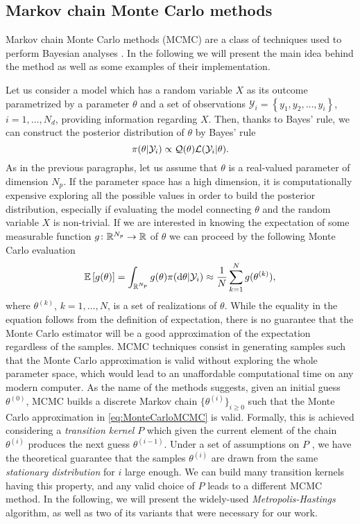 \subsection{Markov chain Monte Carlo methods}

Markov chain Monte Carlo methods (MCMC) are a class of techniques used to perform Bayesian analyses \cite{Gil05, KaS05}. In the following we will present the main idea behind the method as well as some examples of their implementation. 

Let us consider a model which has a random variable $X$ as its outcome parametrized by a parameter $\theta$ and a set of observations $\mathcal{Y}_i = \left\{y_1, y_2, \ldots, y_i\right\}$, $i = 1, \ldots, N_d$, providing information regarding $X$. Then, thanks to Bayes' rule, we can construct the posterior distribution of $\theta$ by Bayes' rule
\begin{equation}
	\pi(\theta|\mathcal{Y}_i) \propto \mathcal{Q}(\theta) \mathcal{L}(\mathcal{Y}_i|\theta).
\end{equation}
As in the previous paragraphs, let us assume that $\theta$ is a real-valued parameter of dimension $N_p$. If the parameter space has a high dimension, it is computationally expensive exploring all the possible values in order to build the posterior distribution, especially if evaluating the model connecting $\theta$ and the random variable $X$ is non-trivial. If we are interested in knowing the expectation of some measurable function $g\colon \mathbb{R}^{N_p} \to \mathbb{R}$ of $\theta$ we can proceed by the following Monte Carlo evaluation
\begin{equation}\label{eq:MonteCarloMCMC}
	 \mathbb{E}\left[g(\theta)\right]= \int_{\mathbb{R}^{N_p}} g(\theta)\pi(\dd\theta|\mathcal{Y}_i) \approx \frac{1}{N}\sum_{k = 1}^{N} g(\theta^{(k)}),
\end{equation}
where $\theta^{(k)}$, $k = 1, \ldots, N$, is a set of realizations of $\theta$. While the equality in the equation follows from the definition of expectation, there is no guarantee that the Monte Carlo estimator will be a good approximation of the expectation regardless of the samples. MCMC techniques consist in generating samples such that the Monte Carlo approximation is valid without exploring the whole parameter space,  which would lead to an unaffordable computational time on any modern computer. As the name of the methods suggests, given an initial guess $\theta^{(0)}$, MCMC builds a discrete Markov chain $\{\theta^{(i)}\}_{i\geq 0}$ such that the Monte Carlo approximation in \eqref{eq:MonteCarloMCMC} is valid. Formally, this is achieved considering a \textit{transition kernel} $P$ which given the current element of the chain $\theta^{(i)}$ produces the next guess $\theta^{(i-1)}$. Under a set of assumptions on $P$ \cite{KaS05}, we have the theoretical guarantee that the samples $\theta^{(i)}$ are drawn from the same \textit{stationary distribution} for $i$ large enough. We can build many transition kernels having this property, and any valid choice of $P$ leads to a different MCMC method. In the following, we will present the widely-used \textit{Metropolis-Hastings} algorithm, as well as two of its variants that were necessary for our work.


